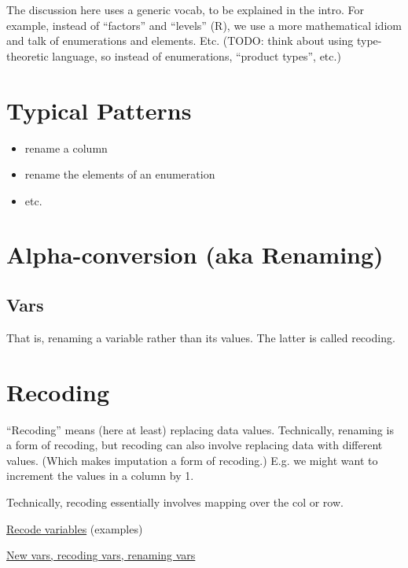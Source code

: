 \begin{ednote}
The discussion here uses a generic vocab, to be explained in the
intro.  For example, instead of ``factors'' and ``levels'' (R), we use
a more mathematical idiom and talk of enumerations and elements.  Etc.
(TODO: think about using type-theoretic language, so instead of
enumerations, ``product types'', etc.)
\end{ednote}

\section{Typical Patterns}

\begin{itemize}
\item rename a column
\item rename the elements of an enumeration
\item etc.
\end{itemize}

\section{Alpha-conversion (aka Renaming)}
\label{sect:datarenaming}

\subsection{Vars}
\label{sect:datavarrrenaming}

That is, renaming a variable rather than its values.  The latter is called recoding.

\section{Recoding}
\label{sect:recodingr}

``Recoding'' means (here at least) replacing data values.
Technically, renaming is a form of recoding, but recoding can also
involve replacing data with different values.  (Which makes imputation
a form of recoding.)  E.g. we might want to increment the values in a
column by 1.

Technically, recoding essentially involves mapping over the col or row.

\href{http://www.uni-kiel.de/psychologie/rexrepos/posts/recode.html}{Recode variables} (examples)

\href{http://www.statmethods.net/management/variables.html}{New vars, recoding vars, renaming vars}

